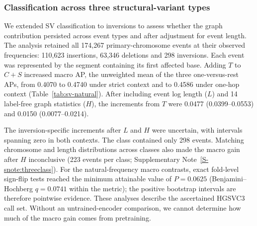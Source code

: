 \documentclass[11pt]{article}
\begin{document}
\begin{bibunit}[unsrtnat]
\subsubsection{Classification across three structural-variant types}
\label{sec:sv-type-extension}

We extended SV classification to inversions to assess whether the graph contribution persisted across event types and after adjustment for event length. The analysis retained all 174,267 primary-chromosome events at their observed frequencies: 110,623 insertions, 63,346 deletions and 298 inversions. Each event was represented by the segment containing its first affected base. Adding $T$ to $C+S$ increased macro AP, the unweighted mean of the three one-versus-rest APs, from 0.4070 to 0.4740 under strict context and to 0.4586 under one-hop context (Table~\ref{tab:sv-natural}). After including event log length ($L$) and 14 label-free graph statistics ($H$), the increments from $T$ were 0.0477 (0.0399--0.0553) and 0.0150 (0.0077--0.0214).

The inversion-specific increments after $L$ and $H$ were uncertain, with intervals spanning zero in both contexts. The class contained only 298 events. Matching chromosome and length distributions across classes also made the macro gain after $H$ inconclusive (223 events per class; Supplementary Note~\ref{S-snote:threeclass}). For the natural-frequency macro contrasts, exact fold-level sign-flip tests reached the minimum attainable value of $P=0.0625$ (Benjamini--Hochberg $q=0.0741$ within the metric); the positive bootstrap intervals are therefore pointwise evidence. These analyses describe the ascertained HGSVC3 call set. Without an untrained-encoder comparison, we cannot determine how much of the macro gain comes from pretraining.


\end{bibunit}
\end{document}
